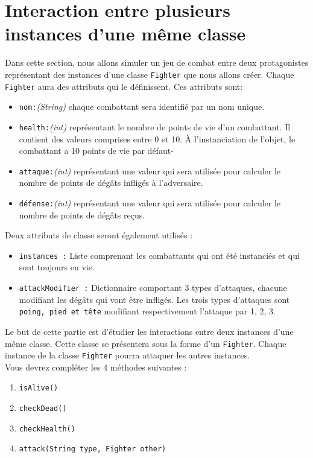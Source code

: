 \section{Interaction entre plusieurs instances d'une même classe}
Dans cette section, nous allons simuler un jeu de combat entre deux protagonistes représentant des instances d'une classe \lstinline{Fighter} que nous allons créer.
Chaque \lstinline{Fighter} aura des attributs qui le définissent. Ces attributs sont:
\begin{itemize}
    \item \lstinline{nom:}\textit{(String)} chaque combattant sera identifié par un nom unique.
    \item \lstinline{health:}\textit{(int)} représentant le nombre de points de vie d'un combattant. Il contient des valeurs comprises entre 0 et 10. À l'instanciation de l'objet, le combattant a 10 points de vie par défaut-
    \item \lstinline{attaque:}\textit{(int)} représentant une valeur qui sera utilisée pour calculer le nombre de points de dégâts infligés à l'adversaire.
    \item \lstinline{défense:}\textit{(int)} représentant une valeur qui sera utilisée pour calculer le nombre de points de dégâts reçus.\\
\end{itemize}

Deux attributs de classe seront également utilisés :
\begin{itemize}
\item \lstinline{instances :} Liste comprenant les combattants qui ont été instanciés et qui sont toujours en vie.
\item \lstinline{attackModifier :} Dictionnaire comportant 3 types d'attaques, chacune modifiant les dégâts qui vont être infligés. Les trois types d'attaques sont \lstinline{poing, pied et tête} modifiant respectivement l'attaque par 1, 2, 3.\\
\end{itemize}

Le but de cette partie est d'étudier les interactions entre deux instances d'une même classe. Cette classe se présentera sous la forme d'un \lstinline{Fighter}. Chaque instance de la classe \lstinline{Fighter} pourra attaquer les autres instances.
\\
Vous devrez compléter les 4 méthodes suivantes :
\begin{enumerate}
\item \lstinline{isAlive()}
\item \lstinline{checkDead()}
\item \lstinline{checkHealth()}
\item \lstinline{attack(String type, Fighter other)}\\
\end{enumerate}


